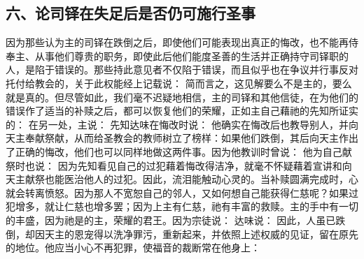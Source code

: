 
\subsection{六、论司铎在失足后是否仍可施行圣事}

因为那些认为主的司铎在跌倒之后，即使他们可能表现出真正的悔改，也不能再侍奉主、从事他们尊贵的职务，即使此后他们能度圣善的生活并正确持守司铎职的人，是陷于错误的。那些持此意见者不仅陷于错误，而且似乎也在争议并行事反对托付给教会的，关于此权能经上记载说：  简而言之，这见解要么不是主的，要么就是真的。但尽管如此，我们毫不迟疑地相信，主的司铎和其他信徒，在为他们的错误作了适当的补赎之后，都可以恢复他们的荣耀，正如主自己藉祂的先知所证实的：  在另一处，主说： 先知达味在悔改时说： 他确实在悔改后也教导别人，并向天主奉献祭献，从而给圣教会的教师树立了榜样：如果他们跌倒，其后向天主作出了正确的悔改，他们也可以同样地做这两件事。因为他教训时曾说： 他为自己献祭时也说： 因为先知看见自己的过犯藉着悔改得洁净，就毫不怀疑藉着宣讲和向天主献祭也能医治他人的过犯。因此，流泪能触动心灵的。当补赎圆满完成时，心就会转离愤怒。因为那人不宽恕自己的邻人，又如何想自己能获得仁慈呢？如果过犯增多，就让仁慈也增多罢；因为上主有仁慈，祂有丰富的救赎。主的手中有一切的丰盛，因为祂是的主，荣耀的君王。因为宗徒说：  达味说： 因此，人虽已跌倒，却因天主的恩宠得以洗净罪污，重新起来，并依照上述权威的见证，留在原先的地位。他应当小心不再犯罪，使福音的裁断常在他身上：  